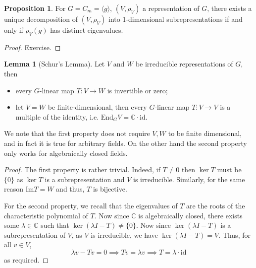 \documentclass[]{article}
\theoremstyle{definition}
\theoremstyle{definition}
\newtheorem{lemma}{Lemma}[section]
\newtheorem{proposition}{Proposition}[section]
\begin{document}
\begin{proposition}
  For \(G = C_m = \langle g \rangle\), \((V, \rho_V)\) a representation of \(G\), 
  there exists a unique decomposition of \((V, \rho_V)\) into 1-dimensional 
  subrepresentations if and only if \(\rho_V(g)\) has distinct eigenvalues.
\end{proposition}
\begin{proof}
  Exercise.
\end{proof}

\begin{lemma}[Schur's Lemma]
  Let \(V\) and \(W\) be irreducible representations of \(G\), then 
  \begin{itemize}
    \item every \(G\)-linear map \(T : V \to W\) is invertible or zero;
    \item let \(V = W\) be finite-dimensional, then every \(G\)-linear map 
      \(T : V \to V\) is a multiple of the identity, i.e. 
      \(\text{End}_G V = \mathbb{C} \cdot \text{id}\).
  \end{itemize}
\end{lemma}

We note that the first property does not require \(V, W\) to be finite dimensional,
and in fact it is true for arbitrary fields. On the other hand the second property 
only works for algebraically closed fields. 

\begin{proof}
  The first property is rather trivial. Indeed, if \(T \neq 0\) then \(\ker T\) 
  must be \(\{0\}\) as \(\ker T\) is a subrepresentation and \(V\) is irreducible.
  Similarly, for the same reason \(\text{Im} T = W\) and thus, \(T\) is bijective. 

  For the second property, we recall that the eigenvalues of \(T\) are the roots 
  of the characteristic polynomial of \(T\). Now since \(\mathbb{C}\) is 
  algebraically closed, there exists some \(\lambda \in \mathbb{C}\) such that 
  \(\ker (\lambda I - T) \neq \{0\}\). Now since \(\ker (\lambda I - T)\) is 
  a subrepresentation of \(V\), as \(V\) is irreducible, we have 
  \(\ker (\lambda I - T) = V\). Thus, for all \(v \in V\), 
  \[\lambda v - T v = 0 \implies T v = \lambda v \implies T = \lambda \cdot \text{id}\]
  as required.
\end{proof}
\end{document}
